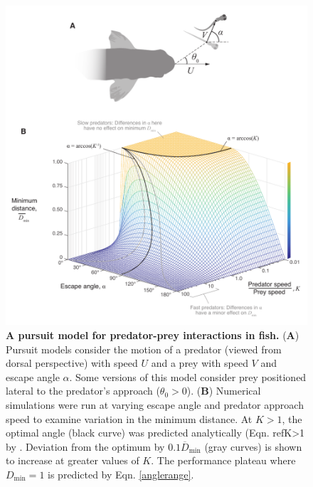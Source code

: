 \documentclass[12pt]{article}
\newcommand{\ol}{\overline}
\begin{document}

\pagebreak
\begin{figure}[t]
\begin{centering}
\includegraphics[width=1\textwidth]{Fig_02.pdf}
\centering	
\caption{\textbf{A pursuit model for predator-prey interactions in fish.}
(\textbf{A}) Pursuit models consider the motion of a predator (viewed from
dorsal perspective) with speed $U$ and a prey with speed $V$ and escape angle
$\alpha$. Some versions of this model consider prey positioned lateral to the
predator's approach ($\theta_0>0$).  (\textbf{B}) Numerical simulations were
run at varying escape angle and predator approach speed to examine variation in
the minimum distance. At $K>1$, the optimal angle (black curve) was predicted
analytically (Eqn. ref{K>1} by \cite{Weihs:1984jq}. Deviation from the optimum
by $0.1\ol D_{\text{min}}$ (gray curves) is shown to increase at greater values
of $K$. The performance plateau where $D_{\text{min}}=1$ is predicted by Eqn.
\ref{anglerange}.}

\label{weihs_topo}
\end{centering}
\end{figure}

\end{document}
